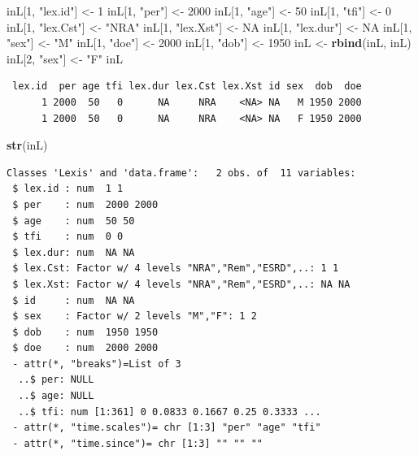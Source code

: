 \documentclass[
]{book}
\newenvironment{Shaded}{\begin{snugshade}}{\end{snugshade}}
\newcommand{\ConstantTok}[1]{\textcolor[rgb]{0.56,0.35,0.01}{#1}}
\newcommand{\DecValTok}[1]{\textcolor[rgb]{0.00,0.00,0.81}{#1}}
\newcommand{\FunctionTok}[1]{\textcolor[rgb]{0.13,0.29,0.53}{\textbf{#1}}}
\newcommand{\NormalTok}[1]{#1}
\newcommand{\OtherTok}[1]{\textcolor[rgb]{0.56,0.35,0.01}{#1}}
\newcommand{\StringTok}[1]{\textcolor[rgb]{0.31,0.60,0.02}{#1}}
\theoremstyle{definition}
\theoremstyle{definition}
\theoremstyle{definition}
\theoremstyle{definition}
\theoremstyle{remark}
\begin{document}
\begin{enumerate}
\begin{Shaded}
\begin{Highlighting}[]
\NormalTok{inL[}\DecValTok{1}\NormalTok{, }\StringTok{"lex.id"}\NormalTok{] }\OtherTok{\textless{}{-}} \DecValTok{1}
\NormalTok{inL[}\DecValTok{1}\NormalTok{, }\StringTok{"per"}\NormalTok{] }\OtherTok{\textless{}{-}} \DecValTok{2000}
\NormalTok{inL[}\DecValTok{1}\NormalTok{, }\StringTok{"age"}\NormalTok{] }\OtherTok{\textless{}{-}} \DecValTok{50}
\NormalTok{inL[}\DecValTok{1}\NormalTok{, }\StringTok{"tfi"}\NormalTok{] }\OtherTok{\textless{}{-}} \DecValTok{0}
\NormalTok{inL[}\DecValTok{1}\NormalTok{, }\StringTok{"lex.Cst"}\NormalTok{] }\OtherTok{\textless{}{-}} \StringTok{"NRA"}
\NormalTok{inL[}\DecValTok{1}\NormalTok{, }\StringTok{"lex.Xst"}\NormalTok{] }\OtherTok{\textless{}{-}} \ConstantTok{NA}
\NormalTok{inL[}\DecValTok{1}\NormalTok{, }\StringTok{"lex.dur"}\NormalTok{] }\OtherTok{\textless{}{-}} \ConstantTok{NA}
\NormalTok{inL[}\DecValTok{1}\NormalTok{, }\StringTok{"sex"}\NormalTok{] }\OtherTok{\textless{}{-}} \StringTok{"M"}
\NormalTok{inL[}\DecValTok{1}\NormalTok{, }\StringTok{"doe"}\NormalTok{] }\OtherTok{\textless{}{-}} \DecValTok{2000}
\NormalTok{inL[}\DecValTok{1}\NormalTok{, }\StringTok{"dob"}\NormalTok{] }\OtherTok{\textless{}{-}} \DecValTok{1950}
\NormalTok{inL }\OtherTok{\textless{}{-}} \FunctionTok{rbind}\NormalTok{(inL, inL)}
\NormalTok{inL[}\DecValTok{2}\NormalTok{, }\StringTok{"sex"}\NormalTok{] }\OtherTok{\textless{}{-}} \StringTok{"F"}
\NormalTok{inL}
\end{Highlighting}
\end{Shaded}

\begin{verbatim}
 lex.id  per age tfi lex.dur lex.Cst lex.Xst id sex  dob  doe
      1 2000  50   0      NA     NRA    <NA> NA   M 1950 2000
      1 2000  50   0      NA     NRA    <NA> NA   F 1950 2000
\end{verbatim}

\begin{Shaded}
\begin{Highlighting}[]
\FunctionTok{str}\NormalTok{(inL)}
\end{Highlighting}
\end{Shaded}

\begin{verbatim}
Classes 'Lexis' and 'data.frame':   2 obs. of  11 variables:
 $ lex.id : num  1 1
 $ per    : num  2000 2000
 $ age    : num  50 50
 $ tfi    : num  0 0
 $ lex.dur: num  NA NA
 $ lex.Cst: Factor w/ 4 levels "NRA","Rem","ESRD",..: 1 1
 $ lex.Xst: Factor w/ 4 levels "NRA","Rem","ESRD",..: NA NA
 $ id     : num  NA NA
 $ sex    : Factor w/ 2 levels "M","F": 1 2
 $ dob    : num  1950 1950
 $ doe    : num  2000 2000
 - attr(*, "breaks")=List of 3
  ..$ per: NULL
  ..$ age: NULL
  ..$ tfi: num [1:361] 0 0.0833 0.1667 0.25 0.3333 ...
 - attr(*, "time.scales")= chr [1:3] "per" "age" "tfi"
 - attr(*, "time.since")= chr [1:3] "" "" ""
\end{verbatim}


\end{enumerate}
\end{document}
